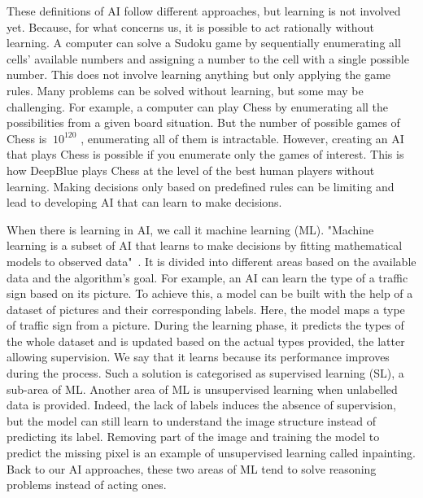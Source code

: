 These definitions of AI follow different approaches, but learning is not involved yet.
Because, for what concerns us, it is possible to act rationally without learning.
A computer can solve a Sudoku game by sequentially enumerating all cells' available numbers and assigning a number to the cell with a single possible number.
This does not involve learning anything but only applying the game rules.
Many problems can be solved without learning, but some may be challenging.
For example, a computer can play Chess by enumerating all the possibilities from a given board situation.
But the number of possible games of Chess is $~10^{120}$ \citep{shannon1950xxii}, enumerating all of them is intractable.
However, creating an AI that plays Chess is possible if you enumerate only the games of interest.
This is how DeepBlue \citep{campbell2002deep} plays Chess at the level of the best human players without learning.
Making decisions only based on predefined rules can be limiting and lead to developing AI that can learn to make decisions.

When there is learning in AI, we call it machine learning (ML).
"Machine learning is a subset of AI that learns to make decisions by fitting mathematical models to observed data"~\citep{prince2023understanding}.
It is divided into different areas based on the available data and the algorithm's goal.
For example, an AI can learn the type of a traffic sign based on its picture.
To achieve this, a model can be built with the help of a dataset of pictures and their corresponding labels.
Here, the model maps a type of traffic sign from a picture.
During the learning phase, it predicts the types of the whole dataset and is updated based on the actual types provided, the latter allowing supervision.
We say that it learns because its performance improves during the process.
Such a solution is categorised as supervised learning (SL), a sub-area of ML.
Another area of ML is unsupervised learning when unlabelled data is provided.
Indeed, the lack of labels induces the absence of supervision, but the model can still learn to understand the image structure instead of predicting its label.
Removing part of the image and training the model to predict the missing pixel is an example of unsupervised learning called inpainting.
Back to our AI approaches, these two areas of ML tend to solve reasoning problems instead of acting ones.


